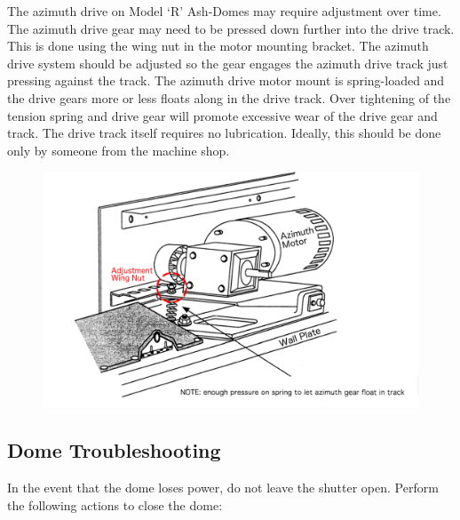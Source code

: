 \documentclass[12pt,titlepage]{article}
\begin{document}
The azimuth drive on Model ‘R’ Ash-Domes may require adjustment over time.
The azimuth drive gear may need to be pressed down further into the drive track.
This is done using the wing nut in the motor mounting bracket.
The azimuth drive system should be adjusted so the gear engages the azimuth drive track just pressing against the track.
The azimuth drive motor mount is spring-loaded and the drive gears more or less floats along in the drive track.
Over tightening of the tension spring and drive gear will promote excessive wear of the drive gear and track.
The drive track itself requires no lubrication.
Ideally, this should be done only by someone from the machine shop.
\begin{figure}[H] 
	\begin{center}
		\includegraphics[width=.8\textwidth]{./images/dome/azimuth_motor_wide.png} 
		\label{azimuth_motor}
	\end{center}
\end{figure}

\subsection{Dome Troubleshooting}

\par In the event that the dome loses power, do not leave the shutter open. Perform the following actions to close the dome:
\end{document}
